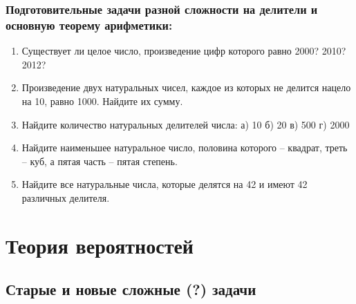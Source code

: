 \documentclass[12pt]{article}
\begin{document}
\subsubsection*{Подготовительные задачи разной сложности на делители и основную теорему арифметики:}
 \begin{enumerate}[start=1,label={\itshape\bfseries \arabic*.}]
	\item Существует ли целое число, произведение цифр которого равно 2000? 2010? 2012?
	\item Произведение двух натуральных чисел, каждое из которых не делится нацело на 10, равно 1000. Найдите их сумму.
	\item Найдите количество натуральных делителей числа: а) 10 б) 20 в) 500 г) 2000
	\item Найдите наименьшее натуральное число, половина которого -- квадрат, треть -- куб, а пятая часть -- пятая степень.
	\item Найдите все натуральные числа, которые делятся на 42 и имеют 42 различных делителя.
\end{enumerate}





\section{Теория вероятностей}
\subsection{Старые и новые сложные (?) задачи}
\end{document}
